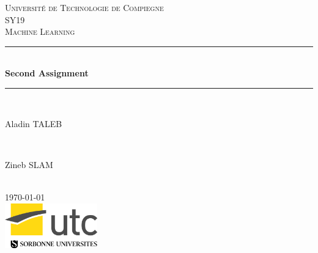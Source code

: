 \documentclass[]{report}
\begin{document}
	
\begin{titlepage}
	
	\newcommand{\HRule}{\rule{\linewidth}{0.5mm}} 
	
	\center 
	
	\textsc{\LARGE Université de Technologie de Compiegne}\\[1.5cm]
	\textsc{\Large SY19}\\[0.5cm] 
	\textsc{\large Machine Learning}\\[0.5cm]
		
	\HRule \\[0.4cm]
	{ \huge \bfseries Second Assignment}\\[0.4cm] 
	\HRule \\[1.5cm]
		
	\begin{minipage}{0.4\textwidth}
		\begin{flushleft} \large
			Aladin \textsc{TALEB} 
		\end{flushleft}
	\end{minipage}
	~
	\begin{minipage}{0.4\textwidth}
		\begin{flushright} \large
			Zineb \textsc{SLAM} 
		\end{flushright}
	\end{minipage}\\[2cm]

	{\large \today}\\[2cm] 

	\includegraphics[width=40mm]{Figures/utc.jpg}\\ %

	\vfill
	
\end{titlepage}


	
\end{document}
